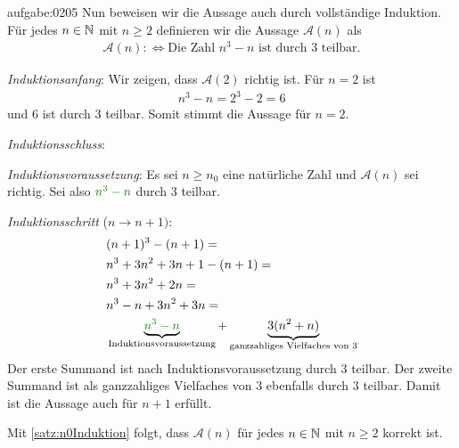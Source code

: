 \begin{antwort}{aufgabe:0205}
Nun beweisen wir die Aussage auch durch vollständige Induktion. Für jedes $n\in\mathbb{N}$ mit $n\geq 2$ definieren wir die Aussage $\mathcal{A}(n)$ als
\begin{align*}
    \mathcal{A}(n) :\iff \text{Die Zahl } n^3-n \text{ ist durch $3$ teilbar}.
\end{align*}
\begin{aenum}
    \item \textit{Induktionsanfang}: Wir zeigen, dass $\mathcal{A}(2)$ richtig ist. Für $n=2$ ist
    \begin{align*}
        n^3-n = 2^3-2 = 6
    \end{align*}
    und $6$ ist durch $3$ teilbar. Somit stimmt die Aussage für $n=2$.
    \item \textit{Induktionsschluss}:
        \begin{renum}
            \item \textit{Induktionsvoraussetzung}: Es sei $n\geq n_0$ eine natürliche Zahl und $\mathcal{A}(n)$ sei richtig. Sei also $\textcolor{Green}{n^3-n}$ durch $3$ teilbar.
            \item \textit{Induktionsschritt} ($n\to n+1)$:
            \begin{align*}
                & (n+1)^3-(n+1) = \\
                & n^3+3n^2+3n+1 - (n+1) = \\
                & n^3+3n^2+2n = \\
                & n^3-n+3n^2+3n = \\
                & \underbrace{\textcolor{Green}{n^3-n}}_{\text{Induktionsvoraussetzung}}+\underbrace{3(n^2+n)}_{\text{ganzzahliges Vielfaches von $3$}}
            \end{align*}
        Der erste Summand ist nach Induktionsvoraussetzung durch $3$ teilbar. Der zweite Summand ist als ganzzahliges Vielfaches von $3$ ebenfalls durch $3$ teilbar. Damit ist die Aussage auch für $n+1$ erfüllt.
        \end{renum}
\end{aenum}
Mit \cref{satz:n0Induktion} folgt, dass $\mathcal{A}(n)$ für jedes $n\in\mathbb{N}$ mit $n\geq 2$ korrekt ist.
\end{antwort}

